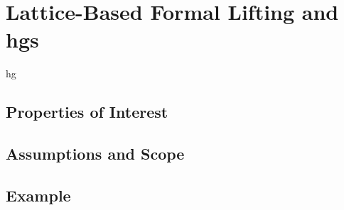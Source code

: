 \chapter{Lattice-Based Formal Lifting and \aclp*{hg}}\label{ch:lattice-lifting}

\Ac{hg}

\section{Properties of Interest}

\section{Assumptions and Scope}

\section{Example}
